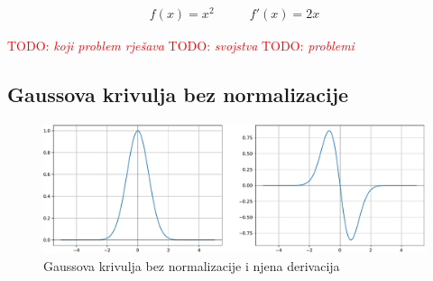 \documentclass[times, utf8, numeric, diplomski]{fer}
\def\TODO#1{\noindent\textcolor{red}{TODO: \textit{#1}}\newline}
\def\todo#1{\TODO{#1}}
\begin{document}
\begin{equation}
\begin{split}
f(x) = x^2
\end{split}
\qquad
\begin{split}
f'(x) = 2x
\end{split}
\end{equation}

\todo{koji problem rješava}
\todo{svojstva}
\todo{problemi}

%

\subsection{Gaussova krivulja bez normalizacije}

\begin{figure}[H]
\includegraphics[width=\textwidth]{Gauss.pdf}
\centering
\caption{Gaussova krivulja bez normalizacije i njena derivacija}
\label{fig:gauss}
\end{figure}
\end{document}
